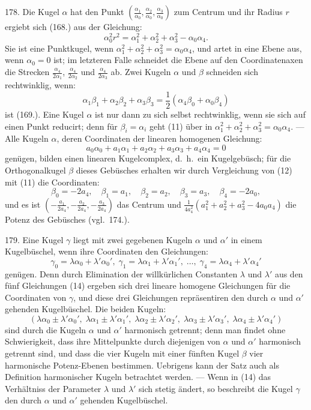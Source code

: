 178. Die Kugel $\alpha$ hat den Punkt $\left(\frac{\alpha_1}{\alpha_0},
       \frac{\alpha_2}{\alpha_0},
       \frac{\alpha_3}{\alpha_0}\right)$ zum
Centrum und ihr Radius $r$ ergiebt sich (168.) aus der Gleichung:
\[
\tag{10}
\alpha_0^2 r^2 = \alpha_1^2 + \alpha_2^2 + \alpha_3^2 - \alpha_0\alpha_4.
\]
Sie ist eine Punktkugel, wenn $\alpha_1^2 + \alpha_2^2 + \alpha_3^2 = \alpha_0\alpha_4$, und
artet in eine Ebene aus, wenn $\alpha_0 = 0$ ist; im letzteren Falle
schneidet die Ebene auf den Coordinatenaxen die Strecken
$\frac{\alpha_4}{2\alpha_1}$, $\frac{\alpha_4}{2\alpha_2}$ und
$\frac{\alpha_4}{2\alpha_3}$ ab. Zwei Kugeln $\alpha$ und $\beta$ schneiden sich
rechtwinklig, wenn:
\[
\tag{11}
\alpha_1\beta_1 + \alpha_2\beta_2 + \alpha_3\beta_3 =
\textstyle\frac{1}{2} (\alpha_4\beta_0 + \alpha_0\beta_4)
\]
ist (169.). Eine Kugel $\alpha$ ist nur dann zu sich selbst rechtwinklig,
wenn sie sich auf einen Punkt reducirt; denn
f\"ur $\beta_i = \alpha_i$ geht (11) \"uber in $\alpha_1^2 + \alpha_2^2 + \alpha_3^2 =
\alpha_0\alpha_4$. --- Alle Kugeln $\alpha$, deren Coordinaten der linearen homogenen
Gleichung:
\[
\tag{12}
a_0\alpha_0 + a_1\alpha_1 + a_2\alpha_2 +
a_3\alpha_3 + a_4\alpha_4 = 0
\]
gen\"ugen, bilden einen linearen Kugelcomplex, d.~h.\ ein Kugelgeb\"usch;
f\"ur die Orthogonalkugel $\beta$ dieses Geb\"usches erhalten
wir durch Vergleichung von (12) mit (11) die Coordinaten:
\[
\tag{13}
  \beta_0 = -2 a_4,\quad
  \beta_1 = a_1,\quad
  \beta_2 = a_2,\quad
  \beta_3 = a_3,\quad
  \beta_4 = -2 a_0,
\]
und es ist
$\left(-\frac{a_1}{2a_4},
       -\frac{a_2}{2a_4},
       -\frac{a_3}{2a_4}\right)$ das Centrum und
$\frac{1}{4 a_4^2} (a_1^2 + a_2^2 + a_3^2 - 4a_0a_4)$ die Potenz des Geb\"usches (vgl.\ 174.).

179. Eine Kugel $\gamma$ liegt mit zwei gegebenen Kugeln
$\alpha$ und $\alpha'$ in einem Kugelb\"uschel, wenn ihre Coordinaten den
Gleichungen:
\[
\tag{14}
\gamma_0 = \lambda\alpha_0 + \lambda' \alpha_0',\;
\gamma_1 = \lambda\alpha_1 + \lambda' \alpha_1',\;
\ldots,\;
\gamma_4 = \lambda\alpha_4 + \lambda' \alpha_4'
\]
gen\"ugen. Denn durch Elimination der willk\"urlichen Constanten
$\lambda$ und $\lambda'$ aus den f\"unf Gleichungen (14) ergeben
sich drei lineare homogene Gleichungen f\"ur die Coordinaten
von $\gamma$, und diese drei Gleichungen repr\"asentiren den durch
$\alpha$ und $\alpha'$ gehenden Kugelb\"uschel. Die beiden Kugeln:
\[
(\lambda\alpha_0\pm\lambda'\alpha_0', \;
 \lambda\alpha_1\pm\lambda'\alpha_1', \;
 \lambda\alpha_2\pm\lambda'\alpha_2', \;
 \lambda\alpha_3\pm\lambda'\alpha_3', \;
 \lambda\alpha_4\pm\lambda'\alpha_4')
\]
sind durch die Kugeln $\alpha$ und $\alpha'$ harmonisch getrennt; denn
man findet ohne Schwierigkeit, dass ihre Mittelpunkte durch
diejenigen von $\alpha$ und $\alpha'$ harmonisch getrennt sind, und dass
die vier Kugeln mit einer f\"unften Kugel $\beta$ vier harmonische
Potenz-Ebenen bestimmen. Uebrigens kann der Satz auch
als Definition harmonischer Kugeln betrachtet werden. --- Wenn
in (14) das Verh\"altniss der Parameter $\lambda$ und $\lambda'$ sich
stetig \"andert, so beschreibt die Kugel $\gamma$ den durch $\alpha$ und $\alpha'$
gehenden Kugelb\"uschel.

